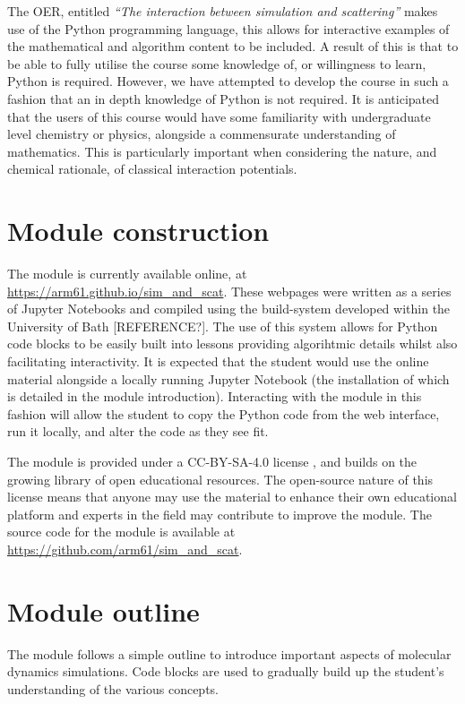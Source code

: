 \documentclass[amsmath,amssymb,twocolumn,superscriptaddress]{revtex4-1}
\begin{document}
The OER, entitled \emph{``The interaction between simulation and scattering''} makes use of the Python programming language, this allows for interactive examples of the mathematical and algorithm content to be included.
A result of this is that to be able to fully utilise the course some knowledge of, or willingness to learn, Python is required.
However, we have attempted to develop the course in such a fashion that an in depth knowledge of Python is not required.
It is anticipated that the users of this course would have some familiarity with undergraduate level chemistry or physics, alongside a commensurate understanding of mathematics.
This is particularly important when considering the nature, and chemical rationale, of classical interaction potentials.

\section{Module construction}

The module is currently available online, at \url{https://arm61.github.io/sim_and_scat}.
These webpages were written as a series of Jupyter Notebooks and compiled using the build-system developed within the University of Bath [REFERENCE?].
The use of this system allows for Python code blocks to be easily built into lessons providing algorihtmic details whilst also facilitating interactivity.
It is expected that the student would use the online material alongside a locally running Jupyter Notebook (the installation of which is detailed in the module introduction).
Interacting with the module in this fashion will allow the student to copy the Python code from the web interface, run it locally, and alter the code as they see fit.

The module is provided under a CC-BY-SA-4.0 license \cite{CCBYSA4}, and builds on the growing library of open educational resources.
The open-source nature of this license means that anyone may use the material to enhance their own educational platform and experts in the field may contribute to improve the module.
The source code for the module is available at \url{https://github.com/arm61/sim_and_scat}.

\section{Module outline}

The module follows a simple outline to introduce important aspects of molecular dynamics simulations.
Code blocks are used to gradually build up the student's understanding of the various concepts.
\end{document}
